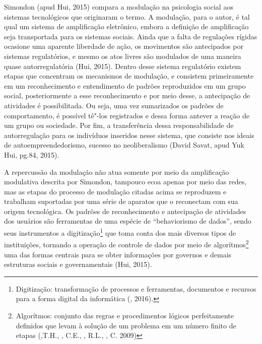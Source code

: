 Simondon (apud Hui, 2015) compara a modulação na psicologia social
aos sistemas tecnológicos que originaram o termo. A modulação, para o
autor, é tal qual um sistema de amplificação eletrônico, embora a
definição de amplificação seja transportada para os sistemas sociais.
Ainda que a falta de regulações rígidas ocasione uma aparente liberdade
de ação, os movimentos são antecipados por sistemas regulatórios, e
mesmo os atos livres são modulados de uma maneira quase autorregulatória
(Hui, 2015). Dentro desse sistema regulatório existem etapas que
concentram os mecanismos de modulação, e consistem primeiramente em um
reconhecimento e entendimento de padrões reproduzidos em um grupo
social, posteriormente a esse reconhecimento e por meio desse, a
antecipação de atividades é possibilitada. Ou seja, uma vez sumarizados
os padrões de comportamento, é possível tê"-los registrados e dessa forma
antever a reação de um grupo ou sociedade. Por fim, a transferência
dessa responsabilidade de autorregulação para os indivíduos inseridos
nesse sistema, que consiste nos ideais de autoempreendedorismo, sucesso
no neoliberalismo (David Savat, apud Yuk Hui, pg.84, 2015).

A repercussão da modulação não atua somente por meio da amplificação
modulativa descrita por Simondon, tampouco ecoa apenas por meio das
redes, mas as etapas do processo de modulação citadas acima se
reproduzem e trabalham suportadas por uma série de aparatos que o
reconectam com sua origem tecnológica. Os padrões de reconhecimento e
antecipação de atividades dos usuários são ferramentas de uma espécie de
``behaviorismo de dados'', sendo seus instrumentos a
digitização\footnote{Digitização: transformação de processos e
  ferramentas, documentos e recursos para a forma digital da informática
  (, 2016).} que toma conta dos mais diversos tipos de
instituições, tornando a operação de controle de dados por meio de
algorítmos\footnote{Algorítmos: conjunto das regras e procedimentos
  lógicos perfeitamente definidos que levam à solução de um problema em
  um número finito de etapas (,T.H., , C.E., ,
  R.L., , C. 2009)} uma das formas centrais para se obter
informações por governos e demais estruturas sociais e governamentais
(Hui, 2015).

